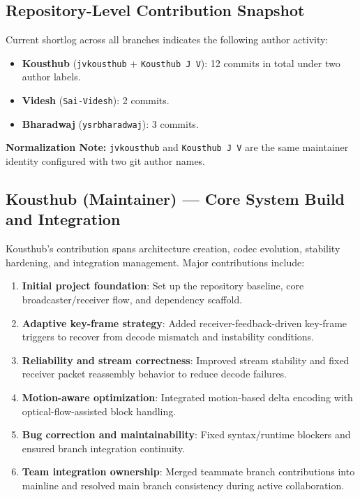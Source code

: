 \documentclass[12pt,a4paper]{article}
\begin{document}
\subsection{Repository-Level Contribution Snapshot}
Current shortlog across all branches indicates the following author activity:
\begin{itemize}[leftmargin=*, itemsep=4pt]
  \item \textbf{Kousthub} (\texttt{jvkousthub} + \texttt{Kousthub J V}): 12 commits in total under two author labels.
  \item \textbf{Videsh} (\texttt{Sai-Videsh}): 2 commits.
  \item \textbf{Bharadwaj} (\texttt{ysrbharadwaj}): 3 commits.
\end{itemize}

\textbf{Normalization Note:} \texttt{jvkousthub} and \texttt{Kousthub J V} are the same maintainer identity configured with two git author names.

\subsection{Kousthub (Maintainer) --- Core System Build and Integration}
Kousthub's contribution spans architecture creation, codec evolution, stability hardening, and integration management. Major contributions include:
\begin{enumerate}[label=\textbf{\arabic*.}, itemsep=6pt]
  \item \textbf{Initial project foundation}: Set up the repository baseline, core broadcaster/receiver flow, and dependency scaffold.
  \item \textbf{Adaptive key-frame strategy}: Added receiver-feedback-driven key-frame triggers to recover from decode mismatch and instability conditions.
  \item \textbf{Reliability and stream correctness}: Improved stream stability and fixed receiver packet reassembly behavior to reduce decode failures.
  \item \textbf{Motion-aware optimization}: Integrated motion-based delta encoding with optical-flow-assisted block handling.
  \item \textbf{Bug correction and maintainability}: Fixed syntax/runtime blockers and ensured branch integration continuity.
  \item \textbf{Team integration ownership}: Merged teammate branch contributions into mainline and resolved main branch consistency during active collaboration.
\end{enumerate}
\end{document}
